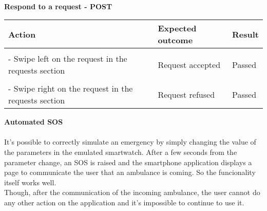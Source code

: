 \textbf{\\Respond to a request - POST}
\begin{center}
	\begin{tabular}{|p{}|p{}|p{}|}
		\hline
		Action & Expected outcome & Result \\
		\hline
		&&\\
		- Swipe left on the request in the requests section & Request accepted & Passed\\
		\hline
		&&\\
		- Swipe right on the request in the requests section & Request refused & Passed\\
		\hline
	\end{tabular}
\end{center}

\newpage

\textbf{Automated SOS}\\\\
It's possible to correctly simulate an emergency by simply changing the value of the parameters in the emulated smartwatch. After a few seconds from the parameter change, an SOS is raised and the smartphone application displays a page to communicate the user that an ambulance is coming. So the funcionality itself works well.\\
Though, after the communication of the incoming ambulance, the user cannot do any other action on the application and it's impossible to continue to use it. 
